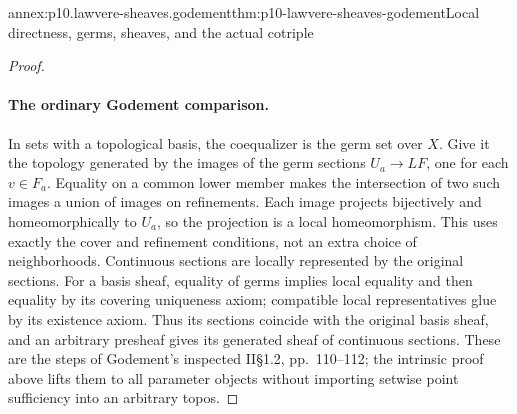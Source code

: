 \begin{annexitem}{annex:p10.lawvere-sheaves.godement}{thm:p10-lawvere-sheaves-godement}{Local directness, germs, sheaves, and the actual cotriple}
\begin{proof}
\paragraph{The ordinary Godement comparison.}
In sets with a topological basis, the coequalizer
is the germ set over \(X\).  Give it the
topology generated by the images of the germ
sections \(U_a\to LF\), one for each
\(v\in F_a\).  Equality on a common lower
member makes the intersection of two such
images a union of images on refinements.
Each image projects bijectively and homeomorphically
to \(U_a\), so the projection is a local
homeomorphism.  This uses exactly the cover
and refinement conditions, not an extra choice
of neighborhoods.  Continuous sections are
locally represented by the original sections.
For a basis sheaf, equality of germs implies
local equality and then equality by its
covering uniqueness axiom; compatible local
representatives glue by its existence axiom.
Thus its sections coincide with the original
basis sheaf, and an arbitrary presheaf gives
its generated sheaf of continuous sections.
These are the steps of Godement's inspected
II\S1.2, pp.~110--112; the intrinsic proof
above lifts them to all parameter objects
without importing setwise point sufficiency
into an arbitrary topos.
\end{proof}
\end{annexitem}

